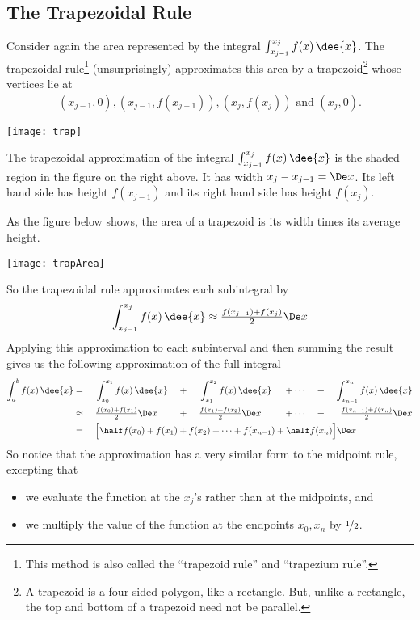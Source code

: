 \subsection{The Trapezoidal Rule}\label{sec:trapRule}
Consider again the area represented by the integral $\int_{x_{j-1}}^{x_j} f(x)\,\dee{x}$.
The trapezoidal rule\footnote{This method is also called the ``trapezoid rule'' and
``trapezium rule''.} (unsurprisingly) approximates this area by a trapezoid\footnote{A
trapezoid is a four sided polygon, like a rectangle. But, unlike a rectangle, the top and
bottom of a trapezoid need not be parallel.} whose vertices lie at
\begin{align*}
  (x_{j-1},0), (x_{j-1},f(x_{j-1})), (x_{j},f(x_{j})) \text{ and } (x_{j},0).
\end{align*}
\begin{efig}
\begin{center}
   \texttt{[image: trap]}
\end{center}
\end{efig}
The trapezoidal approximation of the integral $\int_{x_{j-1}}^{x_j} f(x)\,\dee{x}$ is the
shaded region in the figure on the right above. It has width $x_j-x_{j-1}=\De x$.
Its left hand side has height $f(x_{j-1})$ and its right hand side has
height $f(x_j)$.%

As the figure below shows, the area of a trapezoid is its width times its average height.
\begin{efig}
\begin{center}
   \texttt{[image: trapArea]}
\end{center}
\end{efig}

So the trapezoidal rule approximates each subintegral by
\begin{equation*}
\int_{x_{j-1}}^{x_j} f(x)\,\dee{x}\approx \tfrac{f(x_{j-1})+f(x_j)}{2}\De x
\end{equation*}
Applying this approximation to each subinterval and then summing the result gives us the
following approximation of the full integral
\begin{alignat*}{7}
\int_a^b f(x)\,\dee{x}&=&
&\int_{x_0}^{x_1} f(x)\,\dee{x}&
&\ +\ &
&\int_{x_1}^{x_2} f(x)\,\dee{x}&
&\ +\cdots&
&\ +\ &
\int_{x_{n-1}}^{x_n} f(x)\,\dee{x}\\
&\approx\ &
&\tfrac{f(x_0)+f(x_1)}{2}\De x &
&\ +\ &
&\tfrac{f(x_1)+f(x_2)}{2}\De x&
&\ +\cdots&
&\ +\ &
\tfrac{f(x_{n-1})+f(x_n)}{2}\De x\\
&=\ &
&\Big[\half f(x_0)+f(x_1)+f(x_2)+\cdots+ f(x_{n-1})+\half f(x_n)\Big]\De x
\hidewidth
\end{alignat*}
So notice that the approximation has a very similar form to the midpoint rule, excepting
that
\begin{itemize}
 \item we evaluate the function at the $x_j$'s rather than at the midpoints, and
\item we multiply the value of the function at the endpoints $x_0,x_n$ by $\nicefrac12$.
\end{itemize}


